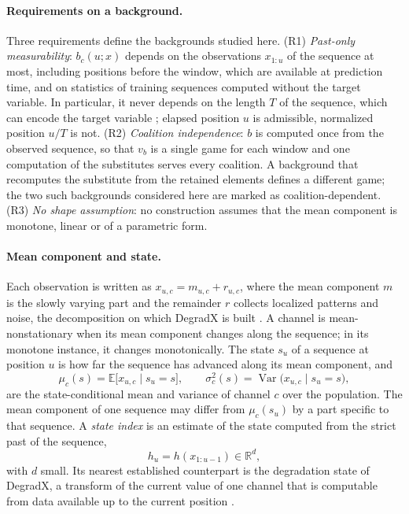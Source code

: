 \documentclass{article}
\begin{document}
\paragraph{Requirements on a background.} Three requirements define the backgrounds studied here. (R1) \emph{Past-only measurability}: $b_c(u;x)$ depends on the observations $x_{1:u}$ of the sequence at most, including positions before the window, which are available at prediction time, and on statistics of training sequences computed without the target variable. In particular, it never depends on the length $T$ of the sequence, which can encode the target variable \citep{degradx2026}; elapsed position $u$ is admissible, normalized position $u/T$ is not. (R2) \emph{Coalition independence}: $b$ is computed once from the observed sequence, so that $v_b$ is a single game for each window and one computation of the substitutes serves every coalition. A background that recomputes the substitute from the retained elements defines a different game; the two such backgrounds considered here are marked as coalition-dependent. (R3) \emph{No shape assumption}: no construction assumes that the mean component is monotone, linear or of a parametric form.

\paragraph{Mean component and state.} Each observation is written as $x_{u,c} = m_{u,c} + r_{u,c}$, where the mean component $m$ is the slowly varying part and the remainder $r$ collects localized patterns and noise, the decomposition on which DegradX is built \citep{degradx2026}. A channel is mean-nonstationary when its mean component changes along the sequence; in its monotone instance, it changes monotonically. The state $s_u$ of a sequence at position $u$ is how far the sequence has advanced along its mean component, and
\begin{equation}\label{eq:statemean}
\mu_c(s) = \mathbb{E}\bigl[x_{u,c}\mid s_u=s\bigr], \qquad \sigma^2_c(s)=\operatorname{Var}\bigl(x_{u,c}\mid s_u=s\bigr),
\end{equation}
are the state-conditional mean and variance of channel $c$ over the population. The mean component of one sequence may differ from $\mu_c(s_u)$ by a part specific to that sequence. A \emph{state index} is an estimate of the state computed from the strict past of the sequence,
\begin{equation}\label{eq:stateindex}
h_u = h(x_{1:u-1}) \in \mathbb{R}^{d},
\end{equation}
with $d$ small. Its nearest established counterpart is the degradation state of DegradX, a transform of the current value of one channel that is computable from data available up to the current position \citep{degradx2026}.
\end{document}
